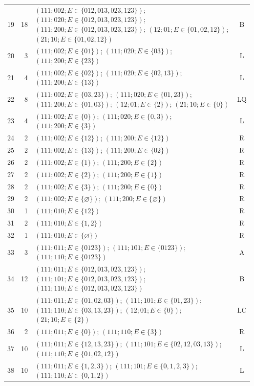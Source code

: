 \begin{longtable}{@{}r r p{10.1cm} c@{}}
19 & 18 & $(111;002;E\in\{012,013,023,123\})$; $(111;020;E\in\{012,013,023,123\})$; $(111;200;E\in\{012,013,023,123\})$; $(12;01;E\in\{01,02,12\})$; $(21;10;E\in\{01,02,12\})$ & B\\[1mm]
20 & 3 & $(111;002;E\in\{01\})$; $(111;020;E\in\{03\})$; $(111;200;E\in\{23\})$ & L\\[1mm]
21 & 4 & $(111;002;E\in\{02\})$; $(111;020;E\in\{02,13\})$; $(111;200;E\in\{13\})$ & L\\[1mm]
22 & 8 & $(111;002;E\in\{03,23\})$; $(111;020;E\in\{01,23\})$; $(111;200;E\in\{01,03\})$; $(12;01;E\in\{2\})$; $(21;10;E\in\{0\})$ & LQ\\[1mm]
23 & 4 & $(111;002;E\in\{0\})$; $(111;020;E\in\{0,3\})$; $(111;200;E\in\{3\})$ & L\\[1mm]
24 & 2 & $(111;002;E\in\{12\})$; $(111;200;E\in\{12\})$ & R\\[1mm]
25 & 2 & $(111;002;E\in\{13\})$; $(111;200;E\in\{02\})$ & R\\[1mm]
26 & 2 & $(111;002;E\in\{1\})$; $(111;200;E\in\{2\})$ & R\\[1mm]
27 & 2 & $(111;002;E\in\{2\})$; $(111;200;E\in\{1\})$ & R\\[1mm]
28 & 2 & $(111;002;E\in\{3\})$; $(111;200;E\in\{0\})$ & R\\[1mm]
29 & 2 & $(111;002;E\in\{\varnothing\})$; $(111;200;E\in\{\varnothing\})$ & R\\[1mm]
30 & 1 & $(111;010;E\in\{12\})$ & R\\[1mm]
31 & 2 & $(111;010;E\in\{1,2\})$ & R\\[1mm]
32 & 1 & $(111;010;E\in\{\varnothing\})$ & R\\[1mm]
33 & 3 & $(111;011;E\in\{0123\})$; $(111;101;E\in\{0123\})$; $(111;110;E\in\{0123\})$ & A\\[1mm]
34 & 12 & $(111;011;E\in\{012,013,023,123\})$; $(111;101;E\in\{012,013,023,123\})$; $(111;110;E\in\{012,013,023,123\})$ & B\\[1mm]
35 & 10 & $(111;011;E\in\{01,02,03\})$; $(111;101;E\in\{01,23\})$; $(111;110;E\in\{03,13,23\})$; $(12;01;E\in\{0\})$; $(21;10;E\in\{2\})$ & LC\\[1mm]
36 & 2 & $(111;011;E\in\{0\})$; $(111;110;E\in\{3\})$ & R\\[1mm]
37 & 10 & $(111;011;E\in\{12,13,23\})$; $(111;101;E\in\{02,12,03,13\})$; $(111;110;E\in\{01,02,12\})$ & L\\[1mm]
38 & 10 & $(111;011;E\in\{1,2,3\})$; $(111;101;E\in\{0,1,2,3\})$; $(111;110;E\in\{0,1,2\})$ & L\\[1mm]

\end{longtable}
